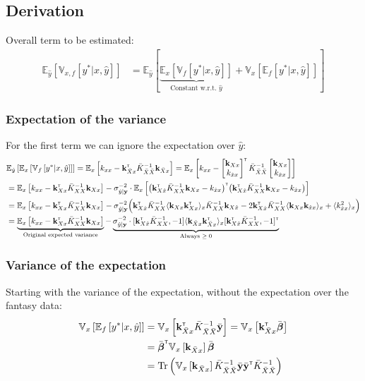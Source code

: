 \documentclass[a4paper,12pt]{article}
\newcommand{\transpose}{^\mathrm{\textsf{\tiny T}}}
\DeclareMathOperator{\Tr}{Tr}
\newcommand{\quadform}[2][]{{#2}\transpose{#1}{#2}}
\newcommand{\inv}{^{-1}}
\newcommand{\ExpSymb}{\mathbb{E}}
\newcommand{\Exp}[2]{\ExpSymb_{#1}\left[#2\right]}
\newcommand{\bExp}[2]{\langle #2 \rangle_{#1}}
\newcommand{\Var}[2]{\mathbb{V}_{#1}\left[#2\right]}
\newcommand{\vk}{\mathbf{k}}
\newcommand{\vy}{\mathbf{y}}
\newcommand{\vbeta}{\boldsymbol{\beta}}
\newcommand{\is}{x}                      %
\newcommand{\os}{y^*}                    %
\newcommand{\fo}{\hat{y}}                %
\newcommand{\fostd}{\sigma_{\fo|\vy}}
\newcommand{\foprec}{\fostd^{-2}}
\newcommand{\fin}{\hat{x}}               %
\newcommand{\Xaug}{\bar{X}}
\newcommand{\yaug}{\bar{\vy}}
\newcommand{\K}{\bar{K}_{XX}}
\newcommand{\Kaug}{\bar{K}_{\Xaug\Xaug}}
\newcommand{\Kaugis}{\vk_{\Xaug \is}}
\begin{document}
\subsection{Derivation}
Overall term to be estimated:
\begin{align}
\Exp{\fo}{\Var{\is, f}{\os | \is, \fo}} &= \Exp{\fo}{\underbrace{\Exp{\is}{\Var{f}{\os|x, \fo}}}_{\text{Constant w.r.t.~$\fo$}} + \Var{\is}{\Exp{f}{\os|\is, \fo}}}
\end{align}

\subsubsection{Expectation of the variance}
For the first term we can ignore the expectation over $\fo$:
\begin{align}
&\Exp{\fo}{\Exp{\is}{\Var{f}{\os|x, \fo}}} = \Exp{\is}{k_{\is\is} - \Kaugis\transpose\Kaug\inv\Kaugis}
= \Exp{\is}{k_{\is\is} - \begin{bmatrix} \vk_{X\is} \\ k_{\fin\is}\end{bmatrix}\transpose \Kaug\inv \begin{bmatrix} \vk_{X\is} \\ k_{\fin\is}\end{bmatrix}} \\
&= \Exp{\is}{k_{\is\is} - \vk_{X\is}\transpose\K\inv\vk_{X\is}} - \foprec\cdot\Exp{\is}{\quadform{\left( \vk_{X\fin}\transpose\K\inv\vk_{X\is} - k_{\fin x} \right)}{}} \\
&= \Exp{\is}{k_{\is\is} - \vk_{X\is}\transpose\K\inv\vk_{X\is}} - \foprec \Big( \vk_{X\fin}\transpose\K\inv\bExp{x}{\vk_{X\is}\vk_{X\is}\transpose}\K\inv\vk_{X\fin} - 2\vk_{X\fin}\transpose\K\inv\bExp{x}{\vk_{X\is}\vk_{\fin\is}} + \bExp{x}{k_{\fin x}^2} \Big)\\
&= \underbrace{\Exp{\is}{k_{\is\is} - \vk_{X\is}\transpose\K\inv\vk_{X\is}}}_{\text{Original expected variance}} - \underbrace{\foprec \cdot [\vk_{X\fin}\transpose\K\inv, -1]\bExp{x}{\vk_{\Xaug\is}\vk_{\Xaug\is}\transpose}[\vk_{X\fin}\transpose\K\inv, -1]\transpose}_{\text{Always $\geq 0$}}
\end{align}

\subsubsection{Variance of the expectation}
Starting with the variance of the expectation, without the expectation over the fantasy data:
\begin{align}
\Var{\is}{\Exp{f}{\os|\is, \fo}} &= \Var{\is}{\Kaugis\transpose\Kaug\inv\yaug} = \Var{\is}{\Kaugis\transpose\bar{\vbeta}} \\
&= \bar{\vbeta}\transpose\Var{\is}{\Kaugis}\bar{\vbeta} \\
&= \Tr\left( \Var{\is}{\Kaugis}\Kaug\inv\yaug\yaug\transpose\Kaug\inv \right)
\end{align}
\end{document}
